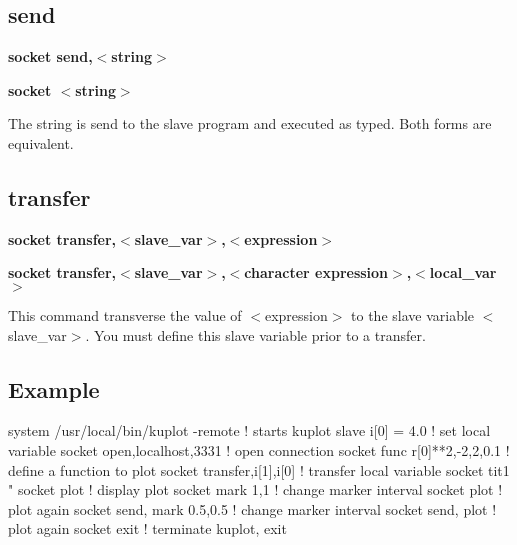 \subsection*{send}
{\bf socket send,$ <$string$> $ \par }
{\bf socket $ <$string$> $ \par }
\par
\vspace{3pt}
The string is send to the slave program and executed as typed. 
Both forms are equivalent. 
\subsection*{transfer}
{\bf socket transfer,$ <$slave\_var$> $,$ <$expression$> $ \par }
{\bf socket transfer,$ <$slave\_var$> $,$ <$character expression$> $,$ <$local\_var$> $ \par }
\par
\vspace{3pt}
This command transverse the value of $ <$expression$> $ to the slave 
variable $ <$slave\_var$> $. You must define this slave variable prior 
to a transfer. 
\subsection*{Example}
\par
\begin{MacVerbatim}
system /usr/local/bin/kuplot -remote   ! starts kuplot slave
i[0] = 4.0                             ! set local variable
socket open,localhost,3331             ! open connection
socket func r[0]**2,-2,2,0.1           ! define a function to plot
socket transfer,i[1],i[0]              ! transfer local variable
socket tit1 "%
socket plot                            ! display plot
socket mark 1,1                        ! change marker interval
socket plot                            ! plot again
socket send, mark 0.5,0.5              ! change marker interval
socket send, plot                      ! plot again
socket exit                            ! terminate kuplot, exit
\end{MacVerbatim}
